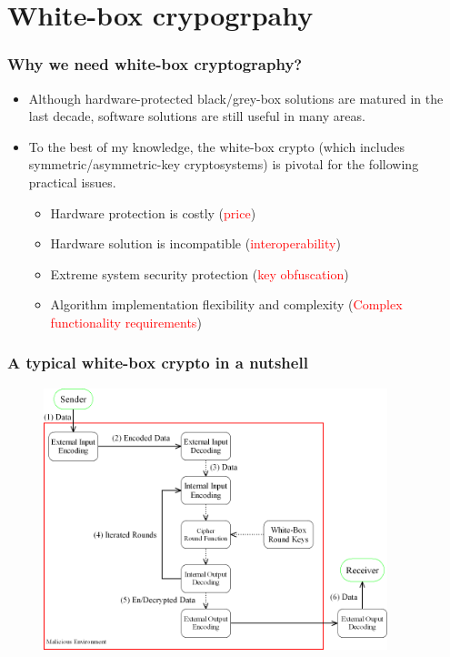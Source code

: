 \documentclass[aspectratio=169,xcolor=dvipsnames]{beamer}
\begin{document}
\section{White-box crypogrpahy}

\frame
{
\frametitle{Why we need white-box cryptography?}
\begin{itemize}
\setlength{\itemsep}{12pt}
\item Although hardware-protected black/grey-box solutions are matured in the last decade, software solutions are still useful in many areas.

\item To the best of my knowledge, the white-box crypto (which includes symmetric/asymmetric-key cryptosystems) is pivotal for the following practical issues.
\begin{itemize}
\setlength{\itemsep}{12pt}
\item Hardware protection is costly (\textcolor{red}{price})
\item Hardware solution is incompatible (\textcolor{red}{interoperability})
\item Extreme system security protection (\textcolor{red}{key obfuscation})
\item Algorithm implementation flexibility and complexity (\textcolor{red}{Complex functionality requirements})
\end{itemize}
\end{itemize}

}

\frame
{
\frametitle{A typical white-box crypto in a nutshell}
\begin{figure}[htbp]
\centering
  \includegraphics[width=10cm]{./pics/WBCrypto_Functional_Model.png}

\end{figure}

}
\end{document}
